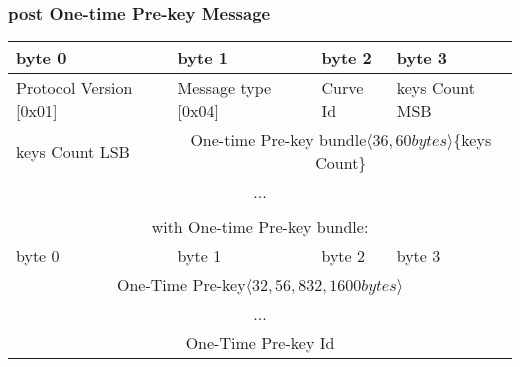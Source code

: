 \documentclass[a4paper,11pt]{article}
\begin{document}
    \subsubsection{post One-time Pre-key Message}
      \begin{center}
      \begin{tabular}{ | p{1.4in} | p{1.4in} | p{1.4in} | p{1.4in} |}
        \hline
        \cellcolor[gray]{0.85} byte 0 & \cellcolor[gray]{0.85} byte 1 & \cellcolor[gray]{0.85} byte 2 & \cellcolor[gray]{0.85}byte 3\\
        \hline
        Protocol Version [0x01] & Message type [0x04] & Curve Id & keys Count MSB\\
        \hline
        keys Count LSB & \multicolumn{3}{c|}{One-time Pre-key bundle$\langle 36,60bytes\rangle $\{keys Count\}}\\
        \cline{1-1}
        \multicolumn{4}{|c|}{...}\\
        \hline
        \multicolumn{4}{c}{}\\
        \multicolumn{4}{c}{with One-time Pre-key bundle:}\\
        \hline
        \cellcolor[gray]{0.95} byte 0 & \cellcolor[gray]{0.95} byte 1 & \cellcolor[gray]{0.95} byte 2 & \cellcolor[gray]{0.95}byte 3\\
        \hline
        \multicolumn{4}{|c|}{One-Time Pre-key$\langle 32,56,832,1600bytes\rangle$}\\
        \multicolumn{4}{|c|}{...}\\
        \hline
        \multicolumn{4}{|c|}{One-Time Pre-key Id}\\
        \hline
      \end{tabular}
      \end{center}
\end{document}
